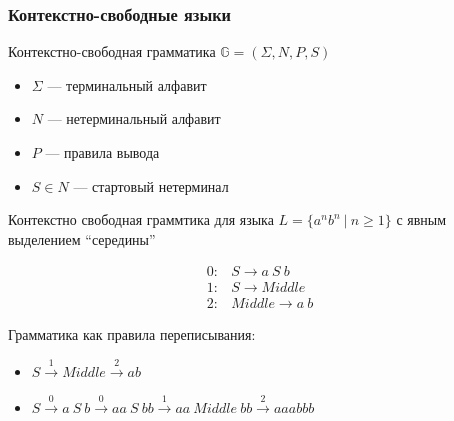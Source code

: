 \documentclass[xcolor=table,aspectratio=169]{beamer}
\begin{document}
\begin{frame}[fragile]
  \transwipe[direction=90]
  \frametitle{Контекстно-свободные языки}
Контекстно-свободная грамматика $\mathbb{G}=(\Sigma,N,P,S)$ 
  \begin{itemize}
      \item $\Sigma$ --- терминальный алфавит
      \item $N$ --- нетерминальный алфавит
      \item $P$ --- правила вывода
      \item $S \in N$ --- стартовый нетерминал
  \end{itemize}

Контекстно свободная граммтика для языка $L=\{a^n b^n \ | \ n \geq 1\}$ с явным выделением ``середины'' \\
\begin{center}
   \[
\begin{array}{rl} 
   0:& S \rightarrow a \ S \ b \\
   1:& S \rightarrow Middle \\
   2:& Middle \rightarrow a \ b
\end{array}
\]
\end{center}

Грамматика как правила переписывания:
 
    \begin{itemize}
        \item $S \xrightarrow{1} Middle \xrightarrow{2} ab$
        \item $S \xrightarrow{0} a\ S\ b \xrightarrow{0} aa\ S\ bb \xrightarrow{1} aa\ Middle\ bb \xrightarrow{2} aaabbb$
    \end{itemize}

\end{frame}
\end{document}
